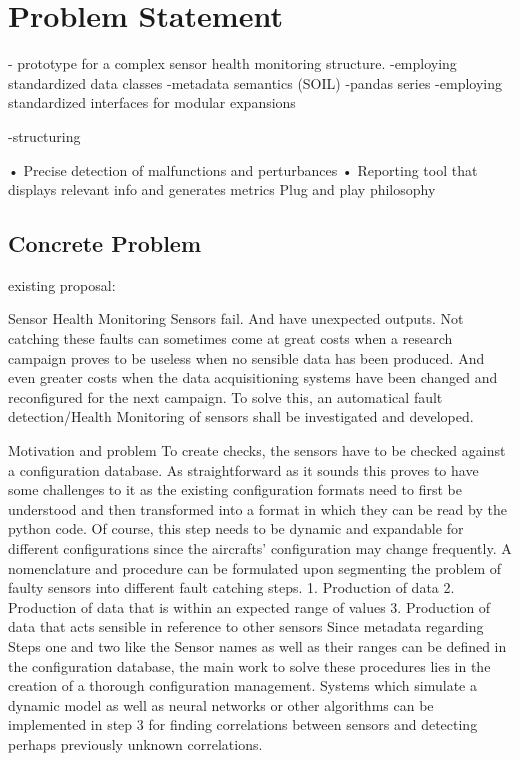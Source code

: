 \chapter{Problem Statement}


- prototype for a complex sensor health monitoring structure.
    -employing standardized data classes
        -metadata semantics (SOIL)
        -pandas series
    -employing standardized interfaces for modular expansions



-structuring



	• Precise detection of malfunctions and perturbances
	• Reporting tool that displays relevant info and generates metrics
Plug and play philosophy

\section{Concrete Problem}

existing proposal:

Sensor Health Monitoring
Sensors fail. And have unexpected outputs. Not catching these faults can sometimes come at great costs when a research campaign proves to be useless when no sensible data has been produced. And even greater costs when the data acquisitioning systems have been changed and reconfigured for the next campaign.
To solve this, an automatical fault detection/Health Monitoring of sensors shall be investigated and developed.

Motivation and problem
To create checks, the sensors have to be checked against a configuration database. As straightforward as it sounds this proves to have some challenges to it as the existing configuration formats need to first be understood and then transformed into a format in which they can be read by the python code. Of course, this step needs to be dynamic and expandable for different configurations since the aircrafts’ configuration may change frequently.
A nomenclature and procedure can be formulated upon segmenting the problem of faulty sensors into different fault catching steps.
1.	Production of data
2.	Production of data that is within an expected range of values
3.	Production of data that acts sensible in reference to other sensors
Since metadata regarding Steps one and two like the Sensor names as well as their ranges can be defined in the configuration database, the main work to solve these procedures lies in the creation of a thorough configuration management.
Systems which simulate a dynamic model as well as neural networks or other algorithms can be implemented in step 3 for finding correlations between sensors and detecting perhaps previously unknown correlations.

